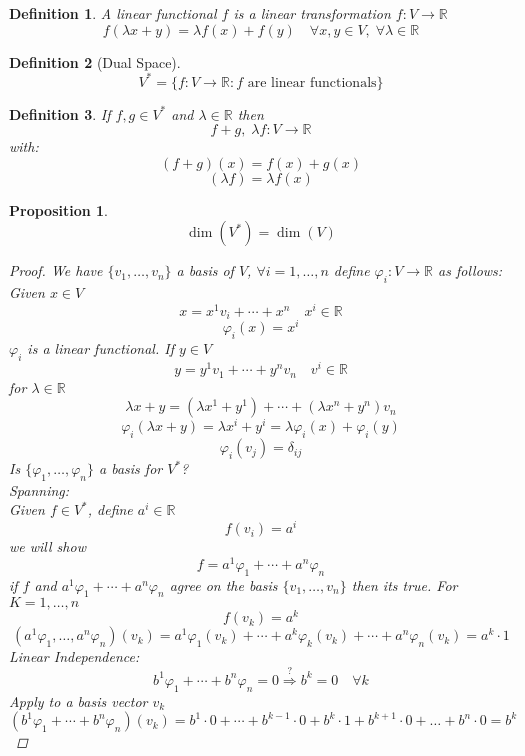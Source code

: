 \documentclass[12pt]{article}
\def\RR{\mathbb{R}}
\newtheorem{definition}{Definition}[section]
\newtheorem{proposition}{Proposition}[section]
\begin{document}
\begin{definition} A linear functional $f$ is a linear transformation $f:V \rightarrow \RR$
\[f(\lambda x + y ) = \lambda f(x) + f(y) \quad \forall x,y \in V, \; \forall \lambda \in \RR\]
\end{definition}

\begin{definition}[Dual Space]
\[V^{*} = \{f:V\rightarrow \RR : f \text{ are linear functionals}\}\]
\end{definition}

\begin{definition}
If $f,g \in V^{*}$ and $\lambda \in \RR$ then
\[f+g, \; \lambda f:V \rightarrow \RR\]
with:
\[(f+g)(x) = f(x) + g(x)\]
\[(\lambda f)  = \lambda f(x)\] \end{definition}

\begin{proposition}
\[\dim(V^{*}) = \dim(V)\]
\begin{proof}
We have $\{v_1, \dots , v_n\}$ a basis of $V$, $\forall i = 1,\dots , n$ define $\varphi_i:V\rightarrow \RR$ as follows:\\
Given $x\in V$
\[x  = x^1v_i + \cdots + x^n \quad x^i \in \RR\]
\[\varphi_i(x) = x^i\]
$\varphi_i$ is a linear functional. If $y \in V$
\[y= y^1v_1 + \cdots + y^nv_n \quad v^i \in \RR\] 
for $\lambda \in \RR$
\[ \lambda x + y = (\lambda x^1 + y^1) + \cdots + (\lambda x^n + y^n)v_n\] 
\[\varphi_i(\lambda x + y) = \lambda x^i + y^i = \lambda\varphi_i(x) + \varphi_i(y)\]
\[\varphi_i(v_j) = \delta_{ij}\]
Is $\{\varphi_1, \dots , \varphi_n\}$ a basis for $V^*$?\\ 
Spanning:\\ Given $f \in V^*$, define $a^i \in \RR$
\[f(v_i) = a^i\]
we will show 
\[f=a^1\varphi_1 + \cdots + a^n\varphi_n\]
if $f$ and $a^1\varphi_1 + \cdots + a^n\varphi_n$ agree on the basis $\{v_1 , \dots , v_n\}$ then its true.
For $K=1,\dots, n$
\[f(v_k) = a^k\]
\[(a^1\varphi_1, \dots ,a^n\varphi_n)(v_k) = a^1\varphi_1(v_k) + \cdots + a^k\varphi_k(v_k) + \cdots + a^n\varphi_n(v_k) = a^k\cdot 1 \]
Linear Independence:\\
\[b^1\varphi_1 + \cdots + b^n\varphi_n = 0 \overset{?}{\Rightarrow} b^k = 0 \quad \forall k\]
Apply to a basis vector $v_k$
\[(b^1\varphi_1 + \cdots + b^n\varphi_n)(v_k) = b^1\cdot 0 +\cdots +b^{k-1}\cdot0 + b^k\cdot 1 + b^{k+1}\cdot 0 + \dots + b^n\cdot 0 = b^k \]
\end{proof}
\end{proposition}
\end{document}
